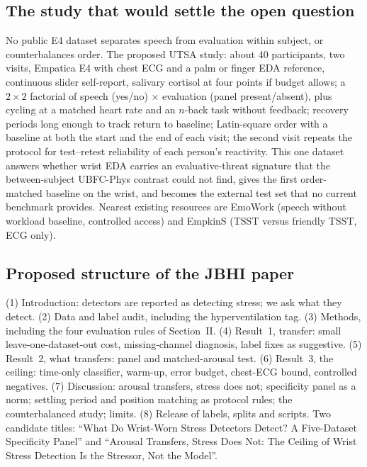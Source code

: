 \documentclass[journal]{IEEEtran}
\begin{document}
\subsection{The study that would settle the open question}
No public E4 dataset separates speech from evaluation within subject, or counterbalances order. The proposed UTSA study: about 40 participants, two visits, Empatica E4 with chest ECG and a palm or finger EDA reference, continuous slider self-report, salivary cortisol at four points if budget allows; a $2\times2$ factorial of speech (yes/no) $\times$ evaluation (panel present/absent), plus cycling at a matched heart rate and an $n$-back task without feedback; recovery periods long enough to track return to baseline; Latin-square order with a baseline at both the start and the end of each visit; the second visit repeats the protocol for test--retest reliability of each person's reactivity. This one dataset answers whether wrist EDA carries an evaluative-threat signature that the between-subject UBFC-Phys contrast could not find, gives the first order-matched baseline on the wrist, and becomes the external test set that no current benchmark provides. Nearest existing resources are EmoWork (speech without workload baseline, controlled access) and EmpkinS (TSST versus friendly TSST, ECG only).

\subsection{Proposed structure of the JBHI paper}
(1) Introduction: detectors are reported as detecting stress; we ask what they detect. (2) Data and label audit, including the hyperventilation tag. (3) Methods, including the four evaluation rules of Section~II. (4) Result~1, transfer: small leave-one-dataset-out cost, missing-channel diagnosis, label fixes as suggestive. (5) Result~2, what transfers: panel and matched-arousal test. (6) Result~3, the ceiling: time-only classifier, warm-up, error budget, chest-ECG bound, controlled negatives. (7) Discussion: arousal transfers, stress does not; specificity panel as a norm; settling period and position matching as protocol rules; the counterbalanced study; limits. (8) Release of labels, splits and scripts. Two candidate titles: ``What Do Wrist-Worn Stress Detectors Detect? A Five-Dataset Specificity Panel'' and ``Arousal Transfers, Stress Does Not: The Ceiling of Wrist Stress Detection Is the Stressor, Not the Model''.
\end{document}
